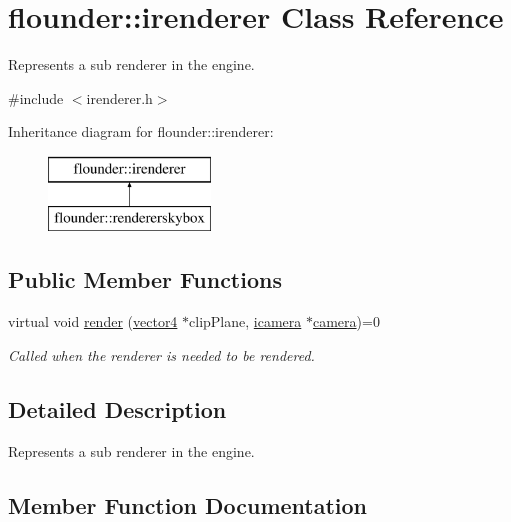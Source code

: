 \hypertarget{classflounder_1_1irenderer}{}\section{flounder\+:\+:irenderer Class Reference}
\label{classflounder_1_1irenderer}


Represents a sub renderer in the engine.  




{\ttfamily \#include $<$irenderer.\+h$>$}

Inheritance diagram for flounder\+:\+:irenderer\+:\begin{figure}[H]
\begin{center}
\leavevmode
\includegraphics[height=2.000000cm]{classflounder_1_1irenderer}
\end{center}
\end{figure}
\subsection*{Public Member Functions}
\begin{DoxyCompactItemize}
\item 
virtual void \hyperlink{classflounder_1_1irenderer_a62a52634ed51582f1c79a4de33e049a3}{render} (\hyperlink{classflounder_1_1vector4}{vector4} $\ast$clip\+Plane, \hyperlink{classflounder_1_1icamera}{icamera} $\ast$\hyperlink{classflounder_1_1camera}{camera})=0
\begin{DoxyCompactList}\small\item\em Called when the renderer is needed to be rendered. \end{DoxyCompactList}\end{DoxyCompactItemize}


\subsection{Detailed Description}
Represents a sub renderer in the engine. 



\subsection{Member Function Documentation}
\mbox{\label{classflounder_1_1irenderer_a62a52634ed51582f1c79a4de33e049a3}} 
